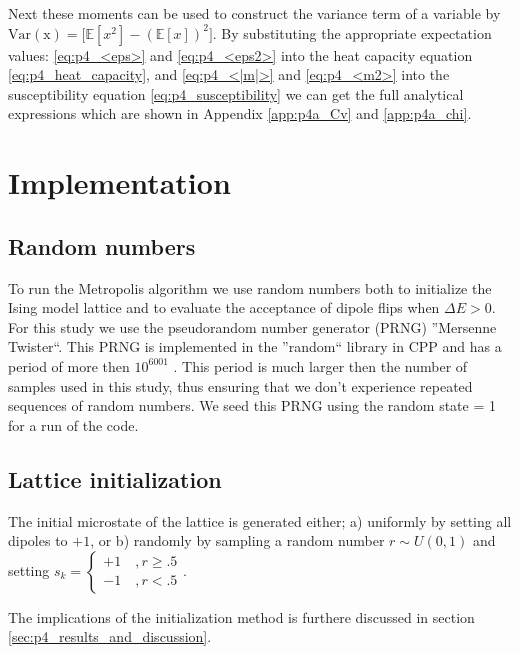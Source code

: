 \documentclass[../main_proj4_correct_template.tex]{subfiles}
\begin{document}
\noindent Next these moments can be used to construct the variance term of a variable by $\operatorname{Var(x)} = \Big[\mathbb{E}[x^{2}] - (\mathbb{E}[x])^{2}\Big]$. By substituting the appropriate expectation values: \eqref{eq:p4_<eps>} and \eqref{eq:p4_<eps2>} into the heat capacity equation \eqref{eq:p4_heat_capacity}, and  \eqref{eq:p4_<|m|>} and \eqref{eq:p4_<m2>} into the susceptibility equation \eqref{eq:p4_susceptibility} we can get the full analytical expressions which are shown in Appendix \ref{app:p4a_Cv} and \ref{app:p4a_chi}.


\section{Implementation}\label{sec:p4_implementation}

\subsection{Random numbers}

To run the Metropolis algorithm we use random numbers both to initialize the Ising model lattice and to evaluate the acceptance of dipole flips when $\Delta E > 0$. For this study we use the pseudorandom number generator (PRNG) ''Mersenne Twister``. This PRNG is implemented in the ''random`` library in CPP and has a period of more then $10^{6001}$ \cite{lecture_notes}. This period is much larger then the number of samples used in this study, thus ensuring that we don't experience repeated sequences of random numbers. We seed this PRNG using the random state = 1 for a run of the code. 


\subsection{Lattice initialization}

The initial microstate of the lattice is generated either; a) uniformly by setting all dipoles to $+1$, or b) randomly by sampling a random number $r\sim U(0,1)$ and setting $s_k = \begin{cases} +1 \quad, r\geq.5 \\ -1\quad, r<.5\end{cases}$. 

\noindent The implications of the initialization method is furthere discussed in section \ref{sec:p4_results_and_discussion}.
\end{document}
